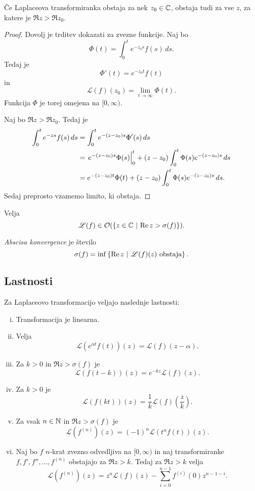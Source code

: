 \begin{trditev}
Če Laplaceova transformiranka obstaja za nek $z_0 \in \mathbb{C}$, obstaja
tudi za vse $z$, za katere je $\Re z > \Re z_0$.
\end{trditev}

\begin{proof}
Dovolj je trditev dokazati za zvezne funkcije. Naj bo
\[
\Phi(t) = \int_0^t e^{-z_0s} f(s)\,ds.
\]
Tedaj je
\[
\Phi'(t) = e^{-z_0t} f(t)
\]
in
\[
\mathscr{L}(f)(z_0) = \lim_{t \to \infty} \Phi(t).
\]
Funkcija $\Phi$ je torej omejena na $[0, \infty)$.

Naj bo $\Re z > \Re z_0$. Tedaj je
\begin{align*}
\int_0^t e^{-zs} f(s)\,ds &=
\int_0^t e^{-(z-z_0)s} \Phi'(s)\,ds
\\
&=
\left. e^{-(z-z_0)s} \Phi(s)\right|_{0}^{t} +
(z-z_0) \int_0^t \Phi(s) e^{-(z-z_0)s}\,ds
\\
&=
e^{-(z-z_0)t} \Phi(t) + (z-z_0) \int_0^t \Phi(s) e^{-(z-z_0)s}\,ds.
\end{align*}
Sedaj preprosto vzamemo limito, ki obstaja.
\end{proof}

\begin{posledica}
Velja
\[
\mathscr{L}(f) \in \mathcal{O}(\left\{z \in \mathbb{C}~\middle\vert~\operatorname{Re} z > \sigma(f)\right\}).
\]
\end{posledica}

\begin{definicija}
\emph{Abscisa konvergence}
je število
\[
\sigma(f) = \inf \left\{\operatorname{Re} z~\middle\vert~\text{$\mathscr{L}(f)(z)$ obstaja}\right\}.
\]
\end{definicija}

\newpage

\subsection{Lastnosti}

\begin{trditev}
Za Laplaceovo transformacijo veljajo naslednje lastnosti:

\begin{enumerate}[i)]
\item Transformacija je linearna.
\item Velja
\[
\mathscr{L}(e^{\alpha t} f(t))(z) = \mathscr{L}(f)(z - \alpha).
\]
\item Za $k > 0$ in $\Re z > \sigma(f)$ je
\[
\mathscr{L}(f(t-k))(z) = e^{-kz} \mathscr{L}(f)(z).
\]
\item Za $k > 0$ je
\[
\mathscr{L}(f(kt))(z) =
\frac{1}{k} \mathscr{L}(f)\left(\frac{z}{k}\right).
\]
\item Za vsak $n \in \mathbb{N}$ in $\Re z > \sigma(f)$ je
\[
\mathscr{L}\left(f^{(n)}\right)(z) =
(-1)^n \mathscr{L}(t^n f(t))(z).
\]
\item Naj bo $f$ $n$-krat zvezno odvedljiva na $[0, \infty)$ in naj
transformiranke $f, f', f'', \dots, f^{(n)}$ obstajajo za
$\Re z > k$. Tedaj za $\Re z > k$ velja
\[
\mathscr{L}\left(f^{(n)}\right)(z) =
z^n \mathscr{L}(f)(z) - \sum_{i=0}^{n-1} f^{(i)}(0) z^{n-1-i}.
\]
\end{enumerate}
\end{trditev}

